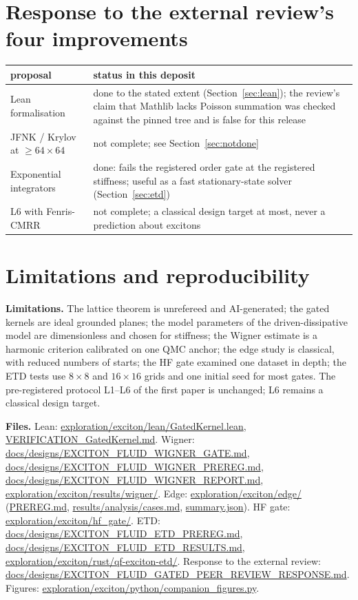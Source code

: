 \documentclass[11pt,a4paper]{article}
\begin{document}
\section{Response to the external review's four improvements}\label{sec:review}

\begin{center}\small
\begin{tabular}{@{}p{}p{}@{}}
\toprule
proposal & status in this deposit \\ \midrule
Lean formalisation & done to the stated extent (Section~\ref{sec:lean}); the review's claim that Mathlib lacks Poisson summation was
checked against the pinned tree and is false for this release \\
JFNK / Krylov at $\ge64\times64$ & not complete; see Section~\ref{sec:notdone} \\
Exponential integrators & done: fails the registered order gate at the registered stiffness; useful as a fast stationary-state
solver (Section~\ref{sec:etd}) \\
L6 with Fenris-CMRR & not complete; a classical design target at most, never a prediction about excitons \\
\bottomrule
\end{tabular}
\end{center}

\section{Limitations and reproducibility}\label{sec:repro}

\textbf{Limitations.} The lattice theorem is unrefereed and AI-generated; the gated kernels are ideal grounded planes; the model
parameters of the driven-dissipative model are dimensionless and chosen for stiffness; the Wigner estimate is a harmonic criterion
calibrated on one QMC anchor; the edge study is classical, with reduced numbers of starts; the HF gate examined one dataset in depth;
the ETD tests use $8\times8$ and $16\times16$ grids and one initial seed for most gates. The pre-registered protocol L1--L6 of the
first paper is unchanged; L6 remains a classical design target.

\textbf{Files.} Lean: \url{exploration/exciton/lean/GatedKernel.lean}, \url{VERIFICATION_GatedKernel.md}. Wigner:
\url{docs/designs/EXCITON_FLUID_WIGNER_GATE.md}, \url{docs/designs/EXCITON_FLUID_WIGNER_PREREG.md}, \url{docs/designs/EXCITON_FLUID_WIGNER_REPORT.md}, \url{exploration/exciton/results/wigner/}. Edge:
\url{exploration/exciton/edge/} (\url{PREREG.md}, \url{results/analysis/cases.md}, \url{summary.json}). HF gate:
\url{exploration/exciton/hf_gate/}. ETD: \url{docs/designs/EXCITON_FLUID_ETD_PREREG.md}, \url{docs/designs/EXCITON_FLUID_ETD_RESULTS.md},
\url{exploration/exciton/rust/qf-exciton-etd/}. Response to the external review:
\url{docs/designs/EXCITON_FLUID_GATED_PEER_REVIEW_RESPONSE.md}. Figures: \url{exploration/exciton/python/companion_figures.py}.
\end{document}
